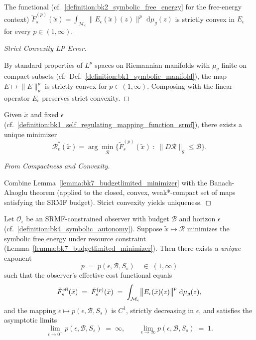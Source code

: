 \begin{lemma}
\label{lemma:bk7_coarsegrained_convexity}
The functional (cf.~\ref{definition:bk2_symbolic_free_energy} for the free-energy context)
\(
\tilde{F}_{s}^{(p)}(\tilde{x})
=\!\displaystyle \int_{\mathcal{M}_{\epsilon}}
\bigl\lVert E_{\epsilon}(\tilde{x})(z)\bigr\rVert^{p}\,
\,\mathrm{d}\mu_{g}(z)
\)
is strictly convex in $E_{\epsilon}$ for every $p\!\in\!(1,\infty)$.
\end{lemma}
\begin{proof}[Strict Convexity LP Error]
\label{proof:bk7_strict_convexity_lp_error}
\leavevmode

By standard properties of $L^{p}$ spaces on Riemannian manifolds with
$\mu_{g}$ finite on compact subsets (cf.~Def.~\ref{definition:bk1_symbolic_manifold}), the map
$E\!\mapsto\!\lVert E\rVert_{p}^{p}$ is strictly convex
for $p\!\in\!(1,\infty)$.  Composing with the linear operator
$E_{\epsilon}$ preserves strict convexity.
\end{proof}
\begin{lemma}
\label{lemma:bk7_budgetlimited_minimizer}
Given $\tilde{x}$ and fixed $\epsilon$ (cf.~\ref{definition:bk1_self_regulating_mapping_function_srmf}), there exists a unique minimizer
\[
\mathcal{R}_{\epsilon}^{*}(\tilde{x})
=\arg\!\min_{\mathcal{R}}
\bigl\{
\tilde{F}_{s}^{(p)}(\tilde{x})
\;:\;
\lVert D\mathcal{R}\rVert_{g}\le\mathcal{B}
\bigr\}.
\]
\end{lemma}
\begin{proof}[From Compactness and Convexity]
\label{proof:bk7_from_compactness_and_convexity}
\leavevmode

Combine Lemma~\ref{lemma:bk7_budgetlimited_minimizer} with the Banach-Alaoglu theorem
(applied to the closed, convex, weak*-compact set of maps satisfying
the SRMF budget).  Strict convexity yields uniqueness.
\end{proof}
\begin{theorem}
\label{theorem:bk7_emergent_lp_norm}
Let $\mathcal{O}_{\epsilon}$ be an SRMF-constrained observer with
budget $\mathcal{B}$ and horizon $\epsilon$ (cf.~\ref{definition:bk4_symbolic_autonomy}).  Suppose
$\tilde{x}\mapsto\mathcal{R}$ minimizes the symbolic free energy
under resource constraint (Lemma~\ref{lemma:bk7_budgetlimited_minimizer}).
Then there exists a \emph{unique} exponent
\[
p\;=\;p(\epsilon,\mathcal{B},S_{s})
\quad\in\;(1,\infty)
\]
such that the observer's effective cost functional equals
\[
\tilde{F}_{s}^{\text{\rm eff}}(\tilde{x})
\;=\;
\tilde{F}_{s}^{(p)}(\tilde{x})
\;=\;
\int_{\mathcal{M}_{\epsilon}}
\bigl\lVert E_{\epsilon}(\tilde{x})(z)\bigr\rVert^{p}\,
\,\mathrm{d}\mu_{g}(z),
\]
and the mapping
$\epsilon\mapsto p(\epsilon,\mathcal{B},S_{s})$ is $C^{1}$,
strictly decreasing in $\epsilon$,
and satisfies the asymptotic limits
\[
\lim_{\epsilon\to 0^{+}} p(\epsilon,\mathcal{B},S_{s}) \;=\;\infty,
\qquad
\lim_{\epsilon\to\infty} p(\epsilon,\mathcal{B},S_{s}) \;=\;1.
\]
\end{theorem}
